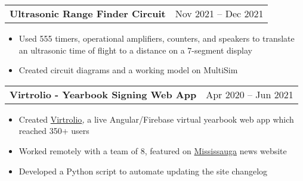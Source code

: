 \documentclass[a4paper,10pt]{article}
\begin{document}
\begin{tabularx}{\linewidth}{@{}X r@{}}
\begin{minipage}[t]{\linewidth}
  \textbf{Ultrasonic Range Finder Circuit}
\end{minipage}
&     Nov 2021 -- Dec 2021
\end{tabularx}
\begin{itemize}[nosep,after=\strut, leftmargin=1em, itemsep=3pt,label=--]
  \item Used 555 timers, operational amplifiers, counters, and speakers to translate an ultrasonic time of flight to a distance on a 7-segment display
\item Created circuit diagrams and a working model on MultiSim
\end{itemize}
\begin{tabularx}{\linewidth}{@{}X r@{}}
\begin{minipage}[t]{\linewidth}
  \textbf{Virtrolio - Yearbook Signing Web App}
\end{minipage}
&     Apr 2020 -- Jun 2021
\end{tabularx}
\begin{itemize}[nosep,after=\strut, leftmargin=1em, itemsep=3pt,label=--]
  \item Created \href{https://virtrolio.web.app/}{Virtrolio}\textit{, }a live Angular/Firebase virtual yearbook web app which reached 350+ users
\item Worked remotely with a team of 8, featured on \href{https://www.mississauga.com/community-story/10071561--something-to-cherish-former-mississauga-students-launch-online-yearbook/}{Mississauga} news website
\item Developed a Python script to automate updating the site changelog
\end{itemize}
\end{document}
